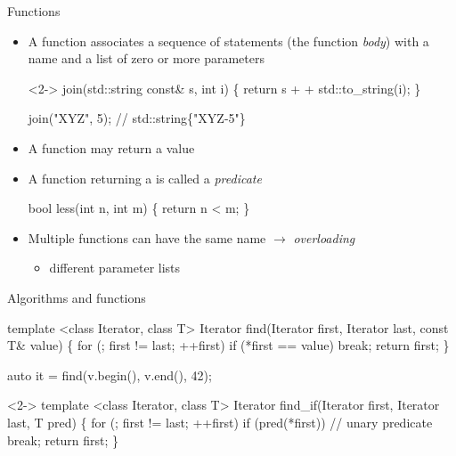 \begin{frame}[fragile]{Functions}

  \begin{itemize}
  \item<1-> A function associates a sequence of statements (the function
    \textit{body}) with a name and a list of zero or more parameters

  \begin{codeblock}<2->
 join(std::string const\& s, int i)
\{
  return s + \upquote{-} + std::to\_string(i);
\}

join("XYZ", 5); // std::string\{"XYZ-5"\}\end{codeblock}

  \item<4-> A function may return a value
  \item<5-> A function returning a  is called a \textit{predicate}
    \begin{codeblock}
\alert<5>{bool} less(int n, int m) \{ return n < m; \}\end{codeblock}

  \item<6-> Multiple functions can have the same name $\rightarrow$
    \textit{overloading}
    \begin{itemize}
    \item different parameter lists
    \end{itemize}
  \end{itemize}

\end{frame}

\begin{frame}[fragile]{Algorithms and functions}

  \begin{codeblock}{\tiny
template <class Iterator, class T>
Iterator find(Iterator first, Iterator last, \alert{const T\& value})
\{
  for (; first != last; ++first)
    if (\alert{*first == value})
      break;
  return first;
\}

auto it = find(v.begin(), v.end(), 42);}\end{codeblock}

  \begin{codeblock}<2->
template <class Iterator, class T>
Iterator find_if(Iterator first, Iterator last, \alert{T pred})
\{
  for (; first != last; ++first)
    if (\alert{pred(*first)})          // unary predicate
      break;
  return first;
\}


\end{codeblock}

\end{frame}

